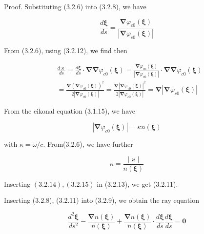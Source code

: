 \documentclass{article}
\begin{document}
Proof. Substituting (3.2.6) into (3.2.8), we have
 
\begin{equation*}
\frac{d \boldsymbol{\xi}}{d s}=\frac{\boldsymbol{\nabla} \varphi_{c 0}(\boldsymbol{\xi})}{\left|\boldsymbol{\nabla} \varphi_{c 0}(\boldsymbol{\xi})\right|} \tag{3.2.12}
\end{equation*}
 

From (3.2.6), using (3.2.12), we find then
 
\begin{align*}
& \frac{d \varkappa}{d s}=\frac{d \boldsymbol{\xi}}{d s} \cdot \boldsymbol{\nabla} \boldsymbol{\nabla} \varphi_{c 0}(\boldsymbol{\xi})=\frac{\boldsymbol{\nabla} \varphi_{c 0}(\boldsymbol{\xi})}{\left|\boldsymbol{\nabla} \varphi_{c 0}(\boldsymbol{\xi})\right|} \cdot \boldsymbol{\nabla} \boldsymbol{\nabla} \varphi_{c 0}(\boldsymbol{\xi})  \tag{3.2.13}\\
&=\frac{\boldsymbol{\nabla}\left(\boldsymbol{\nabla} \varphi_{c 0}(\boldsymbol{\xi})\right)^{2}}{2\left|\boldsymbol{\nabla} \varphi_{c 0}(\boldsymbol{\xi})\right|}=\frac{\boldsymbol{\nabla}\left|\boldsymbol{\nabla} \varphi_{c 0}(\boldsymbol{\xi})\right|^{2}}{2\left|\boldsymbol{\nabla} \varphi_{c 0}(\boldsymbol{\xi})\right|}=\boldsymbol{\nabla}\left|\boldsymbol{\nabla} \varphi_{c 0}(\boldsymbol{\xi})\right|
\end{align*}
 

From the eikonal equation (3.1.15), we have
 
\begin{equation*}
\left|\boldsymbol{\nabla} \varphi_{c 0}(\boldsymbol{\xi})\right|=\kappa n(\boldsymbol{\xi}) \tag{3.2.14}
\end{equation*}
 
with $\kappa=\omega / c$. From(3.2.6), we have further
 
\begin{equation*}
\kappa=\frac{|\varkappa|}{n(\boldsymbol{\xi})} \tag{3.2.15}
\end{equation*}
 

Inserting $(3.2 .14),(3.2 .15)$ in (3.2.13), we get (3.2.11).

Inserting (3.2.8), (3.2.11) into (3.2.9), we obtain the ray equation
 
\begin{equation*}
\frac{d^{2} \boldsymbol{\xi}}{d s^{2}}-\frac{\boldsymbol{\nabla} n(\boldsymbol{\xi})}{n(\boldsymbol{\xi})}+\frac{\boldsymbol{\nabla} n(\boldsymbol{\xi})}{n(\boldsymbol{\xi})} \cdot \frac{d \boldsymbol{\xi}}{d s} \frac{d \boldsymbol{\xi}}{d s}=\mathbf{0} \tag{3.2.16}
\end{equation*}
 
\end{document}
